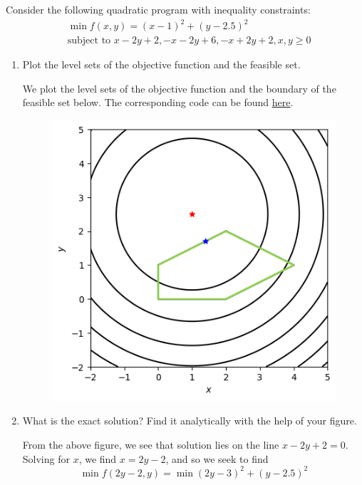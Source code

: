 \documentclass{../kin_math}
\begin{document}
\begin{questions}
  \question Consider the following quadratic program with inequality constraints:
  \begin{align*}
    &\min f(x, y) = (x - 1)^2 + (y - 2.5)^2 \\
    &\text{subject to } x - 2y + 2, -x - 2y + 6, -x + 2y + 2, x, y \geq 0
  \end{align*}
  \begin{enumerate}
    \item Plot the level sets of the objective function and the feasible set.
    \begin{solution}
      We plot the level sets of the objective function and the boundary of the feasible set below. The corresponding code can be found \href{https://github.com/elijahkin/amsc660/blob/main/hw13/hw13.ipynb}{here}.
      \begin{figure}
        \centering
        \includegraphics[scale=0.8]{feasible.png}
      \end{figure}
    \end{solution}
    \item What is the exact solution? Find it analytically with the help of your figure.
    \begin{solution}
      From the above figure, we see that solution lies on the line $x - 2y + 2 = 0$. Solving for $x$, we find $x = 2y - 2$, and so we seek to find
      \begin{equation*}
        \min f(2y - 2, y) = \min (2y - 3)^2 + (y - 2.5)^2
      \end{equation*}

\end{solution}
\end{enumerate}
\end{questions}
\end{document}
